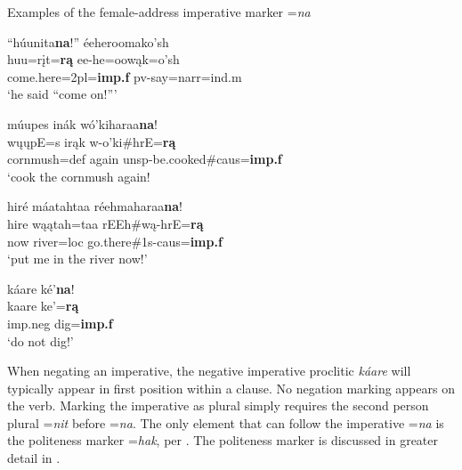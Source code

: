 \begin{exe}

\item\label{femaleimperative} Examples of the female-address imperative marker =\textit{na}

	\begin{xlist}
	
	\item\label{femaleimperative1}
	\glll ``húunita\textbf{na}!'' éeheroomako'sh\\
	huu=rįt=\textbf{rą} ee-he=oowąk=o'sh\\
	\textnormal{come.here}=2pl=\textbf{imp.f} pv-\textnormal{say}=narr=ind.m\\
	\glt `he said ``come on!''' \citep[10]{hollow1973b}

	\item\label{femaleimperative2}
	\glll múupes inák wó'kiharaa\textbf{na}!\\
	wųųpE=s irąk w-o'ki\#hrE=\textbf{rą}\\
	\textnormal{cornmush}=def \textnormal{again} unsp-\textnormal{be.cooked}\#caus=\textbf{imp.f}\\
	\glt `cook the cornmush again! \citep[178]{hollow1973b}
	
	\item\label{femaleimperative3}
	\glll hiré máatahtaa réehmaharaa\textbf{na}!\\
	hire wąątah=taa rEEh\#wą-hrE=\textbf{rą}\\
	\textnormal{now} \textnormal{river}=loc \textnormal{go.there}\#1s-{caus}=\textbf{imp.f}\\
	\glt `put me in the river now!' \citep[322]{hollow1973b}

	\item\label{femaleimperative4}
	\glll káare ké'\textbf{na}!\\
	kaare ke'=\textbf{rą}\\
	imp.neg \textnormal{dig}=\textbf{imp.f}\\
	\glt `do not dig!' \citep[305]{hollow1973b}
	
	\end{xlist}

\end{exe}

When negating an imperative, the negative imperative proclitic \textit{káare} will typically appear in first position within a clause. No negation marking appears on the verb. Marking the imperative as plural simply requires the second person plural =\textit{nit} before =\textit{na}. The only element that can follow the imperative =\textit{na} is the politeness marker =\textit{hak}, per \citet[436]{hollow1970}. The politeness marker is discussed in greater detail in .



